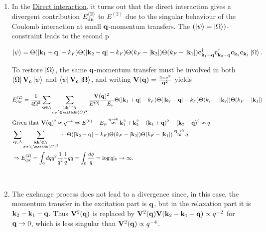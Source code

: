 \documentclass{homework}
\begin{document}
\begin{enumerate}
    \item In the \underline{Direct interaction}, it turns out that the direct interaction gives a divergent contribution $E^{(2)}_{\textnormal{dir}}$ to $E^{(2)}$ due to the singular behaviour of the Coulomb interaction at small ${\bf q}$-momentum transfers. The $(\ket{\psi} = \ket{\Omega})$-constraint leads to the second p
    
    $$
        \ket{\psi} = \Theta(|{\bf k}_1 + {\bf q}| - k_F) \Theta(|{\bf k}_2 - {\bf q}| - k_F) \Theta(k_F - |{\bf k}_2|) \Theta(k_F - |{\bf k}_1|) {\bf c}_{{\bf k}_1 + {\bf q}}^\dagger {\bf c}_{{\bf k}_2 - {\bf q}}^\dagger {\bf c}_{{\bf k}_2} {\bf c}_{{\bf k}_1} \ket{\Omega}.
    $$
    
    To restore $\ket{\Omega}$,  the same ${\bf q}$-momentum transfer must be involved in both $\bra{\Omega} {\bf V}_c \ket{\psi}$ and $\bra{\psi} {\bf V}_c \ket{\Omega}$, and writing ${\bf V}({\bf q}) = \frac{4 \pi e^2}{{\bf q}^2}$ yields
    
    \begin{equation}
    \begin{split}
    & E^{(2)}_{\textnormal{dir}} = \frac{1}{4 \Omega^2} \sum_{{\bf q} \in \Lambda} \sum_{\substack{{\bf k}{\bf k}' \in \Lambda\\
    \sigma \sigma' \in \mathds{C}^2}} \frac{{\bf V}({\bf q})^2}{E^{(0)} - E_{\nu}} \Theta(|{\bf k}_1 + {\bf q}| - k_F) \Theta(|{\bf k}_2 - {\bf q}| - k_F) \Theta(k_F - |{\bf k}_2|) \Theta(k_F - |{\bf k}_1|) \\
    & \textnormal{Given that ${\bf V}({\bf q})^2 \approx q^{-4}$} \Rightarrow E^{(0)} - E_{\psi} \overset{{\bf q} \rightarrow 0}{\approx} {\bf k}_1^2 + {\bf k}_2^2 - ({\bf k}_1+{\bf q})^2 - ({\bf k}_2 - {\bf q})^2 \approx q \\
    & \sum_{{\bf q} \in \Lambda} \sum_{\substack{{\bf k}{\bf k}' \in \Lambda\\
    \sigma \sigma' \in \mathds{C}^2}} \cdots \Theta(|{\bf k}_2 - {\bf q}| - k_F) \Theta(k_F - |{\bf k}_2|) \Theta(k_F - |{\bf k}_1|)  \overset{{\bf q} \rightarrow 0}{\approx} q \\
    & \Rightarrow E^{(2)}_{\textnormal{dir}} = \int_{0} dq q^2 \frac{1}{q^4} \frac{1}{q} q q = \int_{0} \frac{dq}{q} = \log q|_{0} \rightarrow \infty.
    \end{split}
    \end{equation}
    
    \blanky \\
    
    \item The exchange process does not lead to a divergence since, in this case, the momentum transfer in the excitation part is ${\bf q}$, but in the relaxation part it is ${\bf k}_2-{\bf k}_1-{\bf q}$. Thus ${\bf V}^2({\bf q})$ is replaced by ${\bf V}^2({\bf q}){\bf V}({\bf k}_2-{\bf k}_1-{\bf q}) \propto q^{-2}$ for ${\bf q} \rightarrow 0$, which is less singular than ${\bf V}^2({\bf q}) \propto q^{-4}$. \\  
\end{enumerate}
\end{document}
